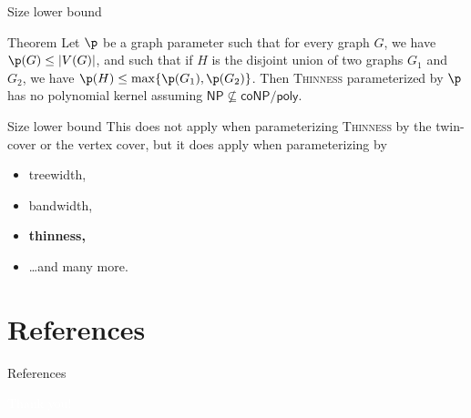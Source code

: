 \documentclass{beamer}
\DeclarePairedDelimiter\abs{\lvert}{\rvert}
\begin{document}
\begin{frame}{Size lower bound}
    \begin{block}{Theorem}
        Let $\p$ be a graph parameter such that for every graph $G$, we have $\p(G) \leq \abs{V(G)}$, and such that if $H$ is the disjoint union of two graphs $G_1$ and $G_2$, we have $\p(H) \leq \max\{\p(G_1), \p(G_2)\}$. Then \textsc{Thinness} parameterized by $\p$ has no polynomial kernel assuming $\textsf{NP} \not\subseteq \textsf{coNP} / \textsf{poly}$.
    \end{block}
\end{frame}

\begin{frame}{Size lower bound}
    This does not apply when parameterizing \textsc{Thinness} by the twin-cover or the vertex cover, but it does apply when parameterizing by
    \begin{itemize}
        \item treewidth,
        \item bandwidth,
        \item \textbf{thinness,}
        \item \dots and many more.
    \end{itemize}
\end{frame}

\section{References}
\begin{frame}{References}
    \tiny
    
    
\end{frame}

{
    \begin{frame}[plain]
        \centering
        {\Huge
        \textcolor{white}{Thank you!}
        }
        
    \end{frame}
}
\end{document}
